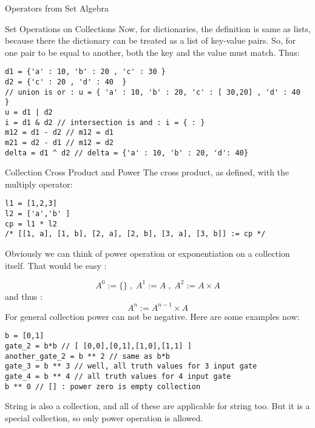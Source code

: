 \begin{section}{Operators from Set Algebra}
\begin{subsection}{Set Operations on Collections}
Now, for dictionaries, the definition is same as lists, 
because there the dictionary can be treated as a list of key-value pairs.
So, for one pair to be equal to another, both the key and the value must match.
Thus:

\begin{center}\begin{minipage}{\linewidth}
\begin{lstlisting}[style=JexlStyle]
d1 = {'a' : 10, 'b' : 20 , 'c' : 30 }
d2 = {'c' : 20 , 'd' : 40  }
// union is or : u = { 'a' : 10, 'b' : 20, 'c' : [ 30,20] , 'd' : 40  }
u = d1 | d2 
i = d1 & d2 // intersection is and : i = { : } 
m12 = d1 - d2 // m12 = d1 
m21 = d2 - d1 // m12 = d2
delta = d1 ^ d2 // delta = {'a' : 10, 'b' : 20, 'd': 40}
\end{lstlisting}
\end{minipage}\end{center}

\end{subsection}

\begin{subsection}{Collection Cross Product and Power}
The cross product, as defined, with the multiply operator:

\begin{center}\begin{minipage}{\linewidth}
\begin{lstlisting}[style=JexlStyle]
l1 = [1,2,3]
l2 = ['a','b' ]
cp = l1 * l2 
/* [[1, a], [1, b], [2, a], [2, b], [3, a], [3, b]] := cp */
\end{lstlisting}
\end{minipage}\end{center}

Obviously we can think of power operation or exponentiation 
on a collection itself. That would be easy :

$$
A^0 := \{\} \; , \; A^1 := A \; , \; A^2 := A \times A
$$
and thus :
$$
A^n :=  A^{n-1} \times A
$$
For general collection power can not be negative.
Here are some examples now:

\begin{lstlisting}[style=JexlStyle]
b = [0,1]
gate_2 = b*b // [ [0,0],[0,1],[1,0],[1,1] ]
another_gate_2 = b ** 2 // same as b*b 
gate_3 = b ** 3 // well, all truth values for 3 input gate 
gate_4 = b ** 4 // all truth values for 4 input gate 
b ** 0 // [] : power zero is empty collection
\end{lstlisting}

String is also a collection, and all of these are applicable for string too.
But it is a special collection, so only power operation is allowed.


\end{subsection}
\end{section}
